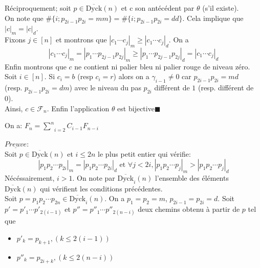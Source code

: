 Réciproquement; soit $p\in \overline{\text{Dyck}}(n) $ et c son antécédent par $\theta$	(s'il existe).\\ On note que $\#\{i; p_{2i-1}p_{2i}=mm\} = \#\{i; p_{2i-1}p_{2i}=dd\}$. Cela implique que $|c|_{m} = |c|_{d}$.\\
Fixons $j\in [n]$ et montrons que $| c_{1}\cdots c_{j} |_{m}\geq | c_{1}\cdots c_{j} |_{d}$. On a \vspace{5pt}
\[
	| c_{1}\cdots c_{j} |_{m} = |  p_{1}\cdots p_{2j-1}p_{2j} |_{m} \geq | p_{1}\cdots p_{2j-1}p_{2j} |_{d} = | c_{1}\cdots c_{j} |_{d}
\]
\text{}\vspace{5pt}
Enfin montrons que $c$ ne contient ni palier bleu ni palier rouge de niveau zéro. \\
Soit $i\in [n]$. Si $c_{i}=b$ (resp $c_{i}=r$) alors on a $\gamma_{i-1}\neq 0$ car $p_{2i-1}p_{2i}=md$ \\ (resp. $p_{2i-1}p_{2i}=dm$) avec le niveau du pas $p_{2i}$ différent de $1$ (resp. différent de 0).\\
Ainsi, $c\in \mathcal{F}_{n}$. Enfin l'application $\theta$ est bijective\hspace{10pt}$\blacksquare$
\begin{proposition}
	On a: $ F_{n} = \underset{i=2}{\overset{n}{\sum}}C_{i-1}F_{n-i} $
\end{proposition}
$\underline{\textit{Preuve}}$:\\
Soit $p \in  \overline{\text{Dyck}}(n)$ et $i \leq 2n$ le plus petit entier qui vérifie:
$$|p_{1}p_{2}\cdots p_{2i}|_{m} = |p_{1}p_{2}\cdots p_{2i}|_{d} \text{ et } \forall j<2i, |p_{1}p_{2}\cdots p_{j}|_{m}>|p_{1}p_{2}\cdots p_{j}|_{d}$$
Nécéssairement, $i > 1$. On note par $\overline{\text{Dyck}}_{i}(n)$ l'ensemble des éléments $\overline{\text{Dyck}}(n)$ qui vérifient les conditions précédentes. \\
Soit $p=p_{1}p_{2}\cdots p_{2n} \in \overline{\text{Dyck}}_{i}(n)$. On a $p_{1} = p_{2} = m$,  $p_{2i-1} = p_{2i} = d$. Soit $p'=p'_{1}\cdots p'_{2(i-1)}$ et $p''=p''_{1} \cdots p''_{2(n-i)}$ deux chemins obtenu à partir de $p$ tel que
\begin{itemize}
	\item $p'_{k}=p_{k+1}, (k\leq 2(i-1))$
	\item $p''_{k}=p_{2i+k}, (k\leq 2(n-i))$
\end{itemize}
